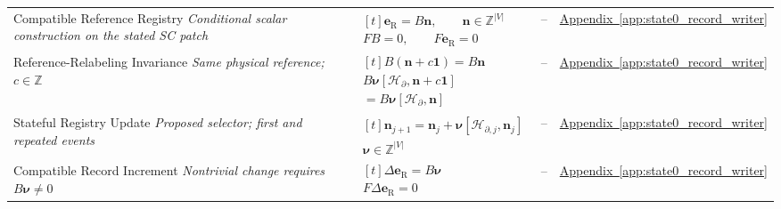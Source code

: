 \begin{longtable}{@{} p{4.5cm} p{6cm} c p{4cm} @{}}
{\raggedright Compatible Reference Registry
\newline \textit{Conditional scalar construction on the stated SC patch}\par}
& {\raggedright $\begin{gathered}[t]
    \mathbf e_{\mathrm R}=B\mathbf n,\qquad
    \mathbf n\in\mathbb Z^{|V|} \\
    FB=0,\qquad F\mathbf e_{\mathrm R}=0
\end{gathered}$\par}
& --
& {\raggedright
\hyperref[app:state0_record_writer]{Appendix~\ref*{app:state0_record_writer}}
\par} \\

{\raggedright Reference-Relabeling Invariance
\newline \textit{Same physical reference; $c\in\mathbb Z$}\par}
& {\raggedright $\begin{gathered}[t]
    B(\mathbf n+c\mathbf 1)=B\mathbf n \\
    B\boldsymbol{\nu}[\mathcal H_{\partial},\mathbf n+c\mathbf 1] \\
    {}=B\boldsymbol{\nu}[\mathcal H_{\partial},\mathbf n]
\end{gathered}$\par}
& --
& {\raggedright
\hyperref[app:state0_record_writer]{Appendix~\ref*{app:state0_record_writer}}
\par} \\

{\raggedright Stateful Registry Update
\newline \textit{Proposed selector; first and repeated events}\par}
& {\raggedright $\begin{gathered}[t]
    \mathbf n_{j+1}
    =\mathbf n_j+\boldsymbol{\nu}[\mathcal H_{\partial,j},\mathbf n_j] \\
    \boldsymbol{\nu}\in\mathbb Z^{|V|}
\end{gathered}$\par}
& --
& {\raggedright
\hyperref[app:state0_record_writer]{Appendix~\ref*{app:state0_record_writer}}
\par} \\

{\raggedright Compatible Record Increment
\newline \textit{Nontrivial change requires $B\boldsymbol{\nu}\neq0$}\par}
& {\raggedright $\begin{gathered}[t]
    \Delta\mathbf e_{\mathrm R}=B\boldsymbol{\nu} \\
    F\Delta\mathbf e_{\mathrm R}=0
\end{gathered}$\par}
& --
& {\raggedright
\hyperref[app:state0_record_writer]{Appendix~\ref*{app:state0_record_writer}}
\par} \\


\end{longtable}
